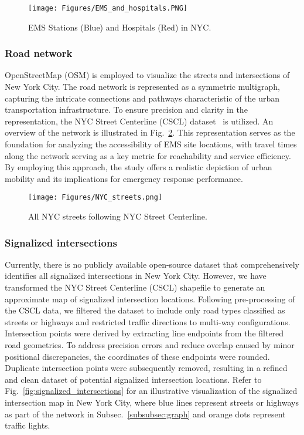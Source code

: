 \begin{figure}[h!]
    \centering
    \texttt{[image: Figures/EMS\_and\_hospitals.PNG]} 
    \caption{EMS Stations (Blue) and Hospitals (Red) in NYC.}
    \label{fig:hospitals_and_ems_stations}
\end{figure}

\subsubsection{Road network}
OpenStreetMap (OSM) is employed to visualize the streets and intersections of New York City. The road network is represented as a symmetric multigraph, capturing the intricate connections and pathways characteristic of the urban transportation infrastructure. To ensure precision and clarity in the representation, the NYC Street Centerline (CSCL) dataset~\cite{nyc_cscl} is utilized.  An overview of the network is illustrated in Fig.~\ref{fig:nyc_street_centerline}. This representation serves as the foundation for analyzing the accessibility of EMS site locations, with travel times along the network serving as a key metric for reachability and service efficiency. By employing this approach, the study offers a realistic depiction of urban mobility and its implications for emergency response performance.

\begin{figure}[h!]
    \centering
    \texttt{[image: Figures/NYC\_streets.png]} 
    \caption{All NYC streets following NYC Street Centerline.}
    \label{fig:nyc_street_centerline}
\end{figure}
\subsubsection{Signalized intersections}
Currently, there is no publicly available open-source dataset that comprehensively identifies all signalized intersections in New York City. However, we have transformed the NYC Street Centerline (CSCL) shapefile to generate an approximate map of signalized intersection locations. Following pre-processing of the CSCL data, we filtered the dataset to include only road types classified as streets or highways and restricted traffic directions to multi-way configurations. Intersection points were derived by extracting line endpoints from the filtered road geometries. To address precision errors and reduce overlap caused by minor positional discrepancies, the coordinates of these endpoints were rounded. Duplicate intersection points were subsequently removed, resulting in a refined and clean dataset of potential signalized intersection locations. Refer to Fig.~\ref{fig:signalized_intersections} for an illustrative visualization of the signalized intersection map in New York City, where blue lines represent streets or highways as part of the network in Subsec.~\ref{subsubsec:graph} and orange dots represent traffic lights.

